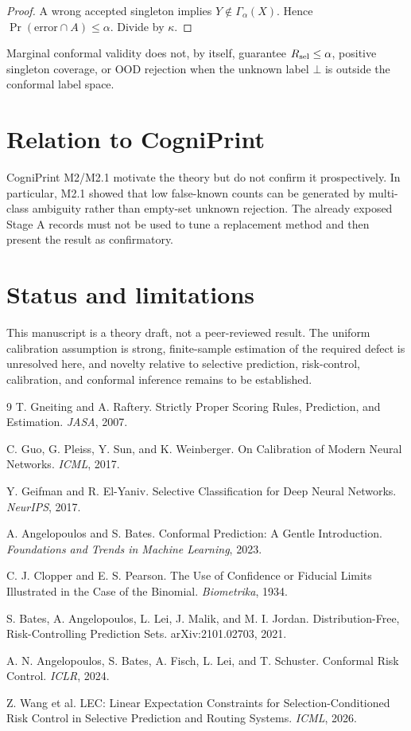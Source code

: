 \documentclass[11pt]{article}
\begin{document}
\begin{proof}
A wrong accepted singleton implies
$Y\notin\Gamma_\alpha(X)$. Hence
$\Pr(\mathrm{error}\cap A)\le\alpha$. Divide by $\kappa$.
\end{proof}

Marginal conformal validity does not, by itself, guarantee
$R_{\rm sel}\le\alpha$, positive singleton coverage, or OOD rejection when the
unknown label $\bot$ is outside the conformal label space.

\section{Relation to CogniPrint}

CogniPrint M2/M2.1 motivate the theory but do not confirm it prospectively.
In particular, M2.1 showed that low false-known counts can be generated by
multi-class ambiguity rather than empty-set unknown rejection. The already
exposed Stage A records must not be used to tune a replacement method and then
present the result as confirmatory.

\section{Status and limitations}

This manuscript is a theory draft, not a peer-reviewed result. The uniform
calibration assumption is strong, finite-sample estimation of the required
defect is unresolved here, and novelty relative to selective prediction,
risk-control, calibration, and conformal inference remains to be established.

\begin{thebibliography}{9}
T. Gneiting and A. Raftery.
Strictly Proper Scoring Rules, Prediction, and Estimation.
\emph{JASA}, 2007.

C. Guo, G. Pleiss, Y. Sun, and K. Weinberger.
On Calibration of Modern Neural Networks.
\emph{ICML}, 2017.

Y. Geifman and R. El-Yaniv.
Selective Classification for Deep Neural Networks.
\emph{NeurIPS}, 2017.

A. Angelopoulos and S. Bates.
Conformal Prediction: A Gentle Introduction.
\emph{Foundations and Trends in Machine Learning}, 2023.

C. J. Clopper and E. S. Pearson.
The Use of Confidence or Fiducial Limits Illustrated in the Case of the Binomial.
\emph{Biometrika}, 1934.

S. Bates, A. Angelopoulos, L. Lei, J. Malik, and M. I. Jordan.
Distribution-Free, Risk-Controlling Prediction Sets.
arXiv:2101.02703, 2021.

A. N. Angelopoulos, S. Bates, A. Fisch, L. Lei, and T. Schuster.
Conformal Risk Control.
\emph{ICLR}, 2024.

Z. Wang et al.
LEC: Linear Expectation Constraints for Selection-Conditioned Risk Control in
Selective Prediction and Routing Systems.
\emph{ICML}, 2026.
\end{thebibliography}
\end{document}
